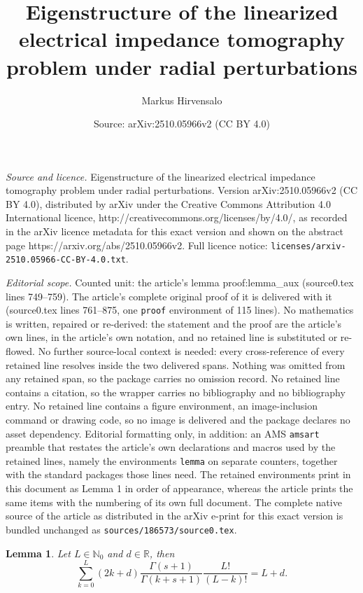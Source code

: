 \documentclass[10pt,a4paper]{amsart}
\title{Eigenstructure of the linearized electrical impedance tomography problem under radial perturbations}
\author{Markus Hirvensalo}
\date{Source: arXiv:2510.05966v2 (CC BY 4.0)}
\newtheorem{lemma}{Lemma}
\newcommand{\N}{\mathbb{N}}
\newcommand{\R}{\mathbb{R}}
\begin{document}
\maketitle

\noindent\emph{Source and licence.} Eigenstructure of the linearized electrical impedance tomography problem under radial perturbations. Version arXiv:2510.05966v2 (CC BY 4.0), distributed by arXiv under the Creative Commons Attribution 4.0 International licence, http://creativecommons.org/licenses/by/4.0/, as recorded in the arXiv licence metadata for this exact version and shown on the abstract page https://arxiv.org/abs/2510.05966v2. Full licence notice: \texttt{licenses/arxiv-2510.05966-CC-BY-4.0.txt}.\par\smallskip

\noindent\textit{Editorial scope.} Counted unit: the article's lemma proof:lemma\_aux (source0.tex lines 749--759). The article's complete original proof of it is delivered with it (source0.tex lines 761--875, one \texttt{proof} environment of 115 lines). No mathematics is written, repaired or re-derived: the statement and the proof are the article's own lines, in the article's own notation, and no retained line is substituted or re-flowed.  No further source-local context is needed: every cross-reference of every retained line resolves inside the two delivered spans.  Nothing was omitted from any retained span, so the package carries no omission record.  No retained line contains a citation, so the wrapper carries no bibliography and no bibliography entry.  No retained line contains a figure environment, an image-inclusion command or drawing code, so no image is delivered and the package declares no asset dependency.  Editorial formatting only, in addition: an AMS \texttt{amsart} preamble that restates the article's own declarations and macros used by the retained lines, namely the environments \texttt{lemma} on separate counters, together with the standard packages those lines need.  The retained environments print in this document as Lemma 1 in order of appearance, whereas the article prints the same items with the numbering of its own full document.  The complete native source of the article as distributed in the arXiv e-print for this exact version is bundled unchanged as \texttt{sources/186573/source0.tex}.
\begin{lemma} \label{proof:lemma_aux}
    Let \( L \in \N_0 \) and \( d \in \R \), then
    \begin{equation} \label{aux:identity}
        \sum^L_{k=0} (2k+d) \frac{\Gamma(s+1)}{\Gamma(k+s+1)} \frac{L!}{(L-k)!} = L + d.
    \end{equation}
\end{lemma}
\end{document}
